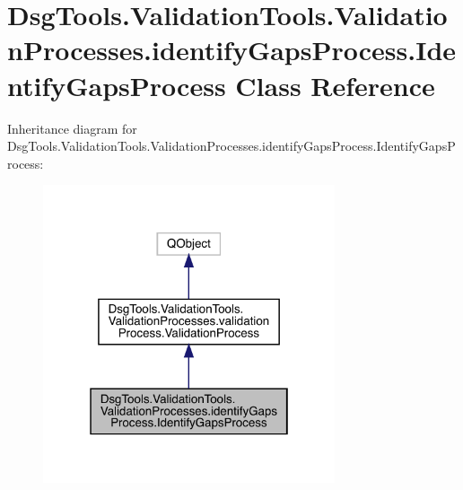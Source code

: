 \hypertarget{class_dsg_tools_1_1_validation_tools_1_1_validation_processes_1_1identify_gaps_process_1_1_identify_gaps_process}{}\section{Dsg\+Tools.\+Validation\+Tools.\+Validation\+Processes.\+identify\+Gaps\+Process.\+Identify\+Gaps\+Process Class Reference}
\label{class_dsg_tools_1_1_validation_tools_1_1_validation_processes_1_1identify_gaps_process_1_1_identify_gaps_process}


Inheritance diagram for Dsg\+Tools.\+Validation\+Tools.\+Validation\+Processes.\+identify\+Gaps\+Process.\+Identify\+Gaps\+Process\+:
\nopagebreak
\begin{figure}[H]
\begin{center}
\leavevmode
\includegraphics[width=244pt]{class_dsg_tools_1_1_validation_tools_1_1_validation_processes_1_1identify_gaps_process_1_1_ident56de7a8651c8dd326a5f5e4d4698049d}
\end{center}
\end{figure}


